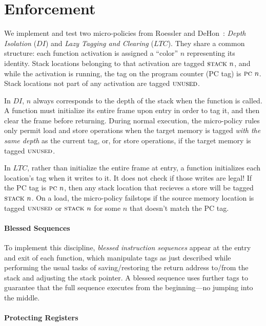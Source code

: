 \documentclass[10pt,conference]{ieeetran}%
\theoremstyle{definition}
\begin{document}
\section{Enforcement}
\label{sec:enforcement}

We implement and test two micro-policies from Roessler and DeHon~\cite{DBLP:conf/sp/RoesslerD18}:
{\em Depth Isolation} (\(DI\)) and {\em Lazy Tagging and Clearing} (\(LTC\)).
They share a common structure: each function activation is assigned a ``color'' \(n\)
representing its identity. Stack locations belonging to that activation are
tagged \(\textsc{stack} ~ n\), and while the activation is running, the tag on the
program counter (PC tag) is \(\textsc{pc} ~ n\). Stack locations not part of
any activation are tagged \(\textsc{unused}\).

In \(DI\), \(n\) always corresponds to the depth of the stack when
the function is called. A function must initialize its entire frame upon entry
in order to tag it, and then clear the frame before returning.
During normal execution, the micro-policy rules only permit load and
store operations when the target memory is tagged {\em with the same depth}
as the current {\PCname} tag, or, for store operations, if the target memory
is tagged \(\textsc{unused}\).

In \(LTC\), rather than initialize the entire frame at entry,
a function initializes each location's tag when it writes to it. It does
not check if those writes are legal! If the PC tag is \(\textsc{pc} ~ n\),
then any stack location that recieves a store will be tagged \(\textsc{stack} ~ n\).
On a load, the micro-policy failstops if the source memory location
is tagged \(\textsc{unused}\) or \(\textsc{stack} ~ n\) for some \(n\) that
doesn't match the PC tag.

\paragraph*{Blessed Sequences}

To implement this discipline, {\em blessed instruction sequences} appear at
the entry and exit of each function, which manipulate tags as just described
while performing the usual tasks of saving/restoring the return address to/from
the stack and adjusting the stack pointer. A blessed sequence uses further tags
to guarantee that the full sequence executes from the beginning---no jumping into the middle.

\paragraph*{Protecting Registers}
\end{document}

